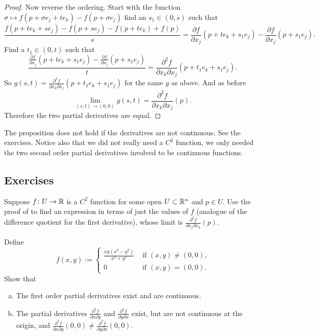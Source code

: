 \begin{proof}
Now reverse the ordering.  Start with
the function $\sigma \mapsto f(p+\sigma e_j + te_k)-f(p + \sigma e_j)$
find an $s_1 \in (0,s)$ such that
\begin{equation*}
\frac{f(p+te_k + se_j)- f(p+s e_j) - f(p+t e_k)+f(p)}{s}
=
\frac{\partial f}{\partial x_j}(p + t e_k + s_1 e_j)
-
\frac{\partial f}{\partial x_j}(p + s_1 e_j) .
\end{equation*}
Find a $t_1 \in (0,t)$ such that
\begin{equation*}
\frac{\frac{\partial f}{\partial x_j}(p + t e_k + s_1 e_j)
-
\frac{\partial f}{\partial x_j}(p + s_1 e_j)}{t}
=
\frac{\partial^2 f}{\partial x_k \partial x_j}(p + t_1 e_k + s_1 e_j) .
\end{equation*}
So $g(s,t) = \frac{\partial^2 f}{\partial x_k \partial
x_j}(p + t_1 e_k + s_1 e_j)$ for the same $g$ as above.  And as before
\begin{equation*}
\lim_{(s,t) \to (0,0)} g(s,t) = 
\frac{\partial^2 f}{\partial x_k \partial x_j}(p) .
\end{equation*}
Therefore the two partial derivatives are equal.
\end{proof}

The proposition does not hold if the derivatives are not
continuous.  See the exercises.
Notice also that we did not really need a $C^2$ function, we only needed the
two second order partial derivatives involved to be continuous functions.

\subsection{Exercises}

\begin{exercise}
Suppose $f \colon U \to {\mathbb{R}}$ is a $C^2$ function for some open $U \subset
{\mathbb{R}}^n$ and $p \in U$.
Use the proof of  to find an expression
in terms of just the values of $f$ (analogue of the difference quotient
for the first derivative), whose limit is
$\frac{\partial^2 f}{ \partial x_j \partial x_k}(p)$.
\end{exercise}

\begin{exercise}
Define
\begin{equation*}
f(x,y) :=
\begin{cases}
\frac{xy(x^2-y^2)}{x^2+y^2} & \text{ if $(x,y) \not= (0,0)$,}\\
0 & \text{ if $(x,y) = (0,0)$.}
\end{cases}
\end{equation*}
Show that
\begin{enumerate}[a)]
\item
The first order partial derivatives exist and are continuous.
\item
The partial derivatives
$\frac{\partial^2 f}{\partial x \partial y}$ and
$\frac{\partial^2 f}{\partial y \partial x}$ exist, but are not continuous
at the origin, and 
$\frac{\partial^2 f}{\partial x \partial y}(0,0) \not= 
\frac{\partial^2 f}{\partial y \partial x}(0,0)$.
\end{enumerate}
\end{exercise}

